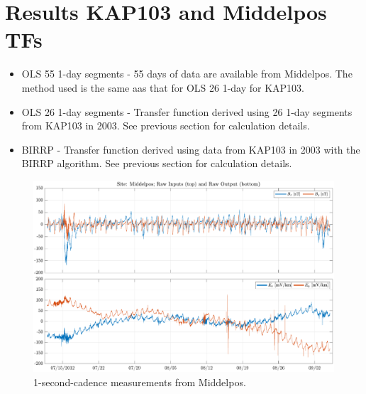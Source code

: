 \documentclass{article}
\begin{document}
\clearpage

\section{Results KAP103 and Middelpos TFs}


\begin{itemize}

    \item OLS 55 1-day segments - 55 days of data are available from Middelpos. The method used is the same aas that for OLS 26 1-day for KAP103.

    \item OLS 26 1-day segments - Transfer function derived using 26 1-day segments from KAP103 in 2003. See previous section for calculation details.
    
    \item BIRRP - Transfer function derived using data from KAP103 in 2003 with the BIRRP algorithm. See previous section for calculation details.
    
\end{itemize}

\begin{figure}[h!]
\centering
\includegraphics[width=\textwidth]{figures/Middelpos/timeseries.pdf}
\caption{1-second-cadence measurements from Middelpos.}
\label{fig:KAP103_timeseries}
\end{figure}

\clearpage

\end{document}
